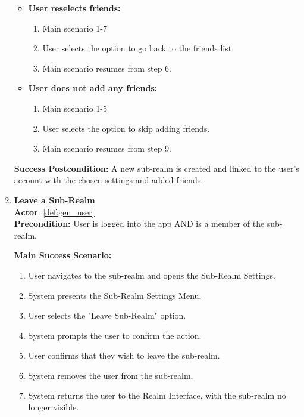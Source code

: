 \documentclass{article}
\begin{document}
\begin{enumerate}[label=\textbf{UC\arabic*}]
\begin{itemize}
            \item[{}] \textbf{User reselects friends:}
            \begin{enumerate}[label=\textbf{\arabic*.}]
                \item Main scenario 1-7
                \item User selects the option to go back to the friends list.
                \item Main scenario resumes from step 6.
            \end{enumerate}
            
            \item[{}] \textbf{User does not add any friends:}
            \begin{enumerate}[label=\textbf{\arabic*.}]
                \item Main scenario 1-5
                \item User selects the option to skip adding friends.
                \item Main scenario resumes from step 9.
            \end{enumerate}
        \end{itemize}
        
        \textbf{Success Postcondition:} A new sub-realm is created and linked to the user’s account with the chosen settings and added friends.

    \item \label{uc:18} \textbf{Leave a Sub-Realm} \\
        \textbf{Actor}: \ref{def:gen_user} \\
        \textbf{Precondition:} User is logged into the app AND is a member of the sub-realm.
    
        \textbf{Main Success Scenario:}
        \begin{enumerate}[label=\textbf{\arabic*.}]
            \item User navigates to the sub-realm and opens the Sub-Realm Settings.
            \item System presents the Sub-Realm Settings Menu.
            \item User selects the "Leave Sub-Realm" option.
            \item System prompts the user to confirm the action.
            \item User confirms that they wish to leave the sub-realm.
            \item System removes the user from the sub-realm.
            \item System returns the user to the Realm Interface, with the sub-realm no longer visible.
        \end{enumerate}
        

\end{enumerate}
\end{document}
